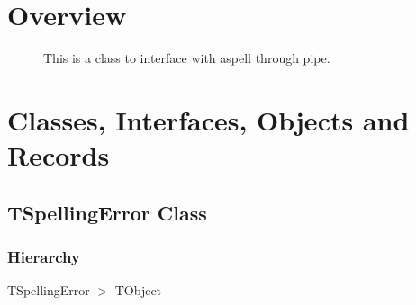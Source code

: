 \documentclass{report}
\newif\ifpdf
\begin{document}
\section{Overview}
\begin{description}
\item[\texttt{\begin{ttfamily}TSpellingError\end{ttfamily} Class}]
\item[\texttt{\begin{ttfamily}TAspellProcess\end{ttfamily} Class}]This is a class to interface with aspell through pipe.
\end{description}
\section{Classes, Interfaces, Objects and Records}
\ifpdf
\subsection*{\large{\textbf{TSpellingError Class}}\normalsize\hspace{1ex}\hrulefill}
\else
\subsection*{TSpellingError Class}
\fi
\label{PasDoc_Aspell.TSpellingError}
\subsubsection*{\large{\textbf{Hierarchy}}\normalsize\hspace{1ex}\hfill}
TSpellingError {$>$} TObject
\end{document}
